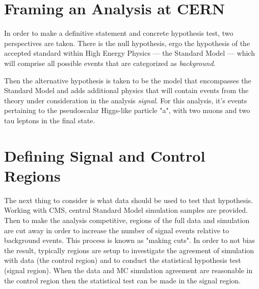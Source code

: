 \section{Framing an Analysis at CERN}
In order to make a definitive statement and concrete hypothesis test, two perspectives are taken. 
There is the null hypothesis, ergo the hypothesis of the accepted standard within High Energy Physics --- the Standard Model --- which will comprise all possible events that are categorized as \textit{background}. 


Then the alternative hypothesis is taken to be the model that encompasses the Standard Model and adds additional physics that will contain events from the theory under consideration in the analysis \textit{signal}. For this analysis, it's events pertaining to the pseudoscalar Higgs-like particle "a", with two muons and two tau leptons in the final state. 

\section{Defining Signal and Control Regions}
The next thing to consider is what data should be used to test that hypothesis. Working with CMS, central Standard Model simulation samples are provided. Then to make the analysis competitive, regions of the full data and simulation are cut away in order to increase the number of signal events relative to background events. This process is known as "making cuts". In order to not bias the result, typically regions are setup to investigate the agreement of simulation with data (the control region) and to conduct the statistical hypothesis test (signal region). When the data and MC simulation agreement are reasonable in the control region then the statistical test can be made in the signal region.  



